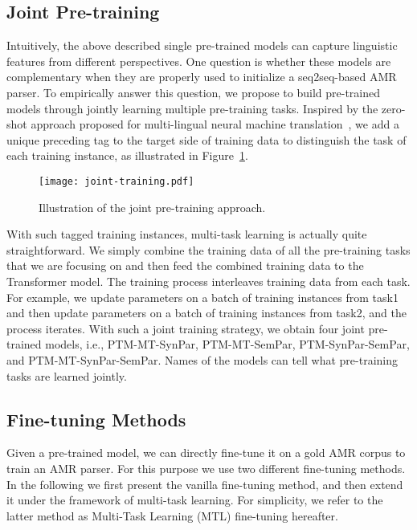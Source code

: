 \documentclass[11pt,a4paper]{article}
\begin{document}
\subsection{Joint Pre-training}
Intuitively, the above described single pre-trained models can capture linguistic features from different perspectives. One question is whether these models are complementary when they are properly used to initialize a seq2seq-based AMR parser. To empirically answer this question, we propose to build pre-trained models through jointly learning multiple pre-training tasks. Inspired by the zero-shot approach proposed for multi-lingual neural machine translation~\cite{johnson_etal_tacl_2017}, we add a unique preceding tag to the target side of training data to distinguish the task of each training instance, as illustrated in Figure~\ref{fig:joint_training}.


\begin{figure}[t]
\begin{center}
\texttt{[image: joint-training.pdf]}
\end{center}
\caption{Illustration of the joint pre-training approach.} \label{fig:joint_training}
\end{figure}


With such tagged training instances, multi-task learning is actually quite straightforward. We simply combine the training data of all the pre-training tasks that we are focusing on and then feed the combined training data to the Transformer model. The training process interleaves training data from each task. For example, we update parameters on a batch of training instances from task1 and then update parameters on a batch of training instances from task2, and the process iterates. With such a joint training strategy, we obtain four joint pre-trained models, i.e., PTM-MT-SynPar, PTM-MT-SemPar, PTM-SynPar-SemPar, and PTM-MT-SynPar-SemPar. Names of the models can tell what pre-training tasks are learned jointly.


\subsection{Fine-tuning Methods}
Given a pre-trained model, we can directly fine-tune it on a gold AMR corpus to train an AMR parser. For this purpose we use two different fine-tuning methods. In the following we first present the vanilla fine-tuning method, and then extend it under the framework of multi-task learning. For simplicity, we refer to the latter method as Multi-Task Learning (MTL) fine-tuning hereafter.
\end{document}
